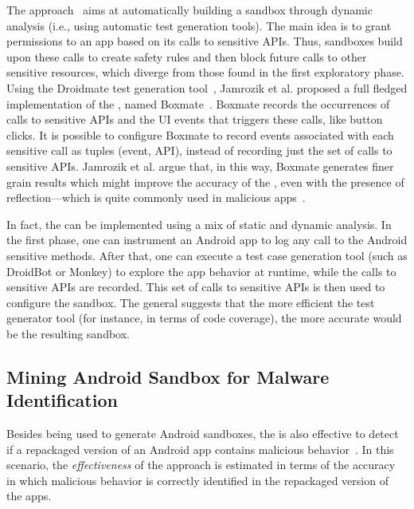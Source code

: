 The \mas approach~\cite{DBLP:conf/icse/JamrozikSZ16} aims at automatically
building a sandbox through dynamic analysis (i.e., using automatic test generation tools).
The main idea is to grant permissions to an app based on its calls to sensitive APIs.
Thus, sandboxes build upon these calls to create safety rules and then block future
calls to other sensitive resources, which diverge from those found in the first exploratory
phase. Using the Droidmate test generation tool~\cite{DBLP:conf/icse/JamrozikZ16},
Jamrozik et al. proposed a full fledged
implementation of the \mas, named Boxmate~\cite{DBLP:conf/icse/JamrozikSZ16}. 
Boxmate records the occurrences of calls to sensitive APIs and the UI events that triggers these calls,
like button clicks. It is possible to configure Boxmate to record events associated with each sensitive call as
tuples (event, API), instead of recording just the set of calls to sensitive APIs. Jamrozik et al. argue that, in this way, Boxmate generates finer
grain results which
might improve the accuracy of the \mas, even with the presence of reflection---which is quite commonly used in
malicious apps~\cite{DBLP:conf/issta/0029BOK16}.

In fact, the \mas can be implemented using
a mix of static and dynamic analysis. In the first phase, one
can instrument an Android app to log any call to the Android sensitive methods.
After that, one can execute a test case generation tool (such as DroidBot
or Monkey) to explore the app behavior at runtime,
while the calls to sensitive APIs are recorded.
This set of calls to sensitive APIs is then used
to configure the sandbox. The general \mas %
suggests that the more efficient the test generator tool (for instance, in terms of code coverage),
the more accurate would be the resulting sandbox.





\subsection{Mining Android Sandbox for Malware Identification}

Besides being used to generate Android sandboxes, the \mas is also effective 
to detect if a repackaged version of an Android app contains malicious
behavior~\cite{DBLP:conf/wcre/BaoLL18}. In this scenario, the \emph{effectiveness} of the approach
is estimated in terms of the accuracy in which malicious behavior is correctly identified in the repackaged version of the
apps.


